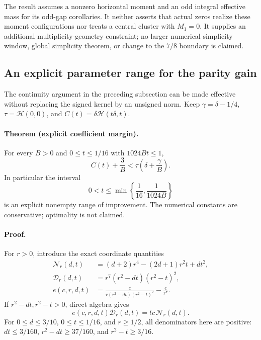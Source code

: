 The result assumes a nonzero horizontal moment and an odd integral
effective mass for its odd-gap corollaries.  It neither asserts that
actual zeros realize these moment configurations nor treats a
central cluster with \(M_1=0\).  It supplies an additional
multiplicity-geometry constraint; no larger numerical simplicity
window, global simplicity theorem, or change to the \(7/8\) boundary
is claimed.

\subsection{An explicit parameter range for the parity gain}
\label{sec:effective-parity-threshold}

The continuity argument in the preceding subsection can be made
effective without replacing the signed kernel by an unsigned norm.
Keep \(\gamma=\delta-1/4\), \(\tau=\mathcal H(0,0)\), and
\(C(t)=\delta\mathcal H(t\delta,t)\).

\paragraph{Theorem (explicit coefficient margin).}
For every \(B>0\) and \(0\le t\le1/16\) with \(1024Bt\le1\),
\begin{equation}
 C(t)+\frac3B
 <\tau\left(\delta+\frac{\gamma}{B}\right).
 \label{eq:explicit-parity-coefficient-margin}
\end{equation}
In particular the interval
\[
 0<t\le\min\left\{\frac1{16},\frac1{1024B}\right\}
\]
is an explicit nonempty range of improvement.  The numerical
constants are conservative; optimality is not claimed.

\paragraph{Proof.}
For \(r>0\), introduce the exact coordinate quantities
\[
 \begin{split}
 \mathcal N_r(d,t)&=(d+2)r^4-(2d+1)r^2t+dt^2,\\
 \mathcal D_r(d,t)&=r^7(r^2-dt)(r^2-t)^2,\\
 e(c,r,d,t)&=\frac{c}{r(r^2-dt)(r^2-t)^2}-\frac{c}{r^7}.
 \end{split}
\]
If \(r^2-dt,r^2-t>0\), direct algebra gives
\begin{equation}
 e(c,r,d,t)\mathcal D_r(d,t)=tc\,\mathcal N_r(d,t).
 \label{eq:coordinate-increment-identity}
\end{equation}
For \(0\le d\le3/10\), \(0\le t\le1/16\), and \(r\ge1/2\),
all denominators here are positive: \(dt\le3/160\),
\(r^2-dt\ge37/160\), and \(r^2-t\ge3/16\).

